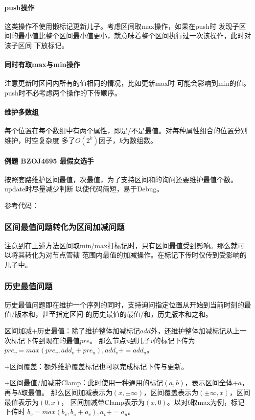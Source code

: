 \paragraph{push操作}这类操作不使用懒标记更新儿子。考虑区间取max操作，如果在push时
发现子区间的最小值比整个区间最小值更小，就意味着整个区间执行过一次该操作，此时对该子区间
下放标记。

\paragraph{同时有取max与min操作}注意更新时区间内所有的值相同的情况，比如更新max时
可能会影响到min的值。push时不必考虑两个操作的下传顺序。

\paragraph{维护多数组}
每个位置在每个数组中有两个属性，即是/不是最值。对每种属性组合的位置分别维护，时空复杂度
多了$O(2^k)$因子，$k$为数组数。

\paragraph{例题 BZOJ4695 最假女选手}
按照套路维护区间最值，次最值，为了支持区间和的询问还要维护最值个数。update时尽量减少判断
以使代码简短，易于Debug。

参考代码：


\subsubsection{区间最值问题转化为区间加减问题}
注意到在上述方法区间取min/max打标记时，只有区间最值受到影响。那么就可以将其转化为对节点管辖
范围内最值的加减操作。在标记下传时仅传到受影响的儿子中。
\subsubsection{历史最值问题}
历史最值问题即在维护一个序列的同时，支持询问指定位置从开始到当前时刻的最值/版本和，甚至指定区间
的历史最值的最值/和，历史版本和之和。

区间加减+历史最值：除了维护整体加减标记$add$外，还维护整体加减标记从上一次标记下传到现在的最值$pre$。
那么节点$u$到儿子$v$的标记下传为$pre_v=max(pre_v,add_v+pre_u),add_v+=add_u$。

+区间覆盖：额外维护覆盖标记也可以完成标记下传与更新。

+区间最值/加减带Clamp：此时使用一种通用的标记$(a,b)$，表示区间全体$+a$，再与$b$取最值。
那么区间加减表示为$(x,\pm\infty)$，区间覆盖表示为$(\pm\infty,x)$，区间最值表示为$(0,x)$，
区间加减带Clamp表示为$(x,0)$。以对$b$取max为例，标记下传时
$b_v=max(b_v,b_u+a_v),a_v+=a_u$。

